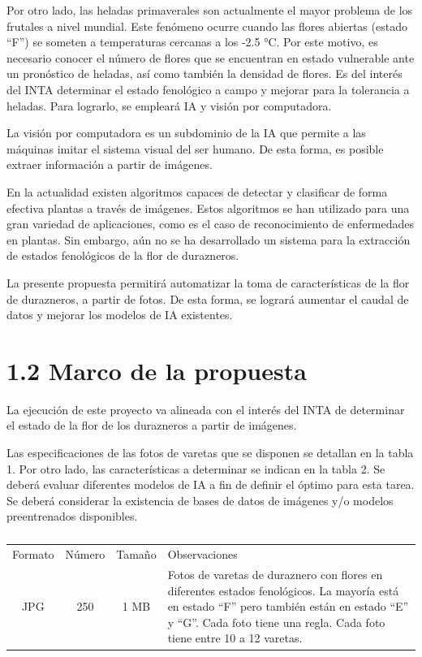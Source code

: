 \documentclass[
11pt, %
codirector, %
]{charter}
\begin{document}
Por otro lado, las heladas primaverales son actualmente el mayor problema de los frutales a nivel mundial. Este fenómeno ocurre cuando las flores abiertas (estado “F”) se someten a temperaturas cercanas a los -2.5 °C. Por este motivo, es necesario conocer el número de flores que se encuentran en estado vulnerable ante un pronóstico de heladas, así como también la densidad de flores. Es del interés del INTA determinar el estado fenológico a campo y mejorar para la tolerancia a heladas. Para lograrlo, se empleará IA y visión por computadora.

La visión por computadora es un subdominio de la IA que permite a las máquinas imitar el sistema visual del ser humano. De esta forma, es posible extraer información a partir de imágenes. 

En la actualidad existen algoritmos capaces de detectar y clasificar de forma efectiva plantas a través de imágenes. Estos algoritmos se han utilizado para una gran variedad de aplicaciones, como es el caso de reconocimiento de enfermedades en plantas. Sin embargo, aún no se ha desarrollado un sistema para la extracción de estados fenológicos de la flor de durazneros.

La presente propuesta permitirá automatizar la toma de características de la flor de durazneros, a partir de fotos. De esta forma, se logrará aumentar el caudal de datos y mejorar los modelos de IA existentes.

\section{1.2 Marco de la propuesta}
\label{sec:descripcion}

La ejecución de este proyecto va alineada con el interés del INTA de determinar el estado de la flor de los durazneros a partir de imágenes.

Las especificaciones de las fotos de varetas que se disponen se detallan en la tabla 1. Por otro lado, las características a determinar se indican en la tabla 2. Se deberá evaluar diferentes modelos de IA a fin de definir el óptimo para esta tarea. Se deberá considerar la existencia de bases de datos de imágenes y/o modelos preentrenados disponibles.

\renewcommand{\tablename}{Tabla}
\begin{table}[ht]
\begin{center}
\begin{tabularx}{\textwidth}{| c | c | c | X | }
\hline
\rowcolor[HTML]{C0C0C0}
\multicolumn{4}{ |c| }{Características de las fotos de duraznos} \\ \hline
Formato & Número & Tamaño & Observaciones \\ \hline
JPG     & 250    & 1 MB   & Fotos de varetas de duraznero con flores en           diferentes estados fenológicos. La mayoría está en estado “F” pero también están en estado “E” y “G”. Cada foto tiene una regla. Cada foto tiene entre 10 a 12 varetas. \\ \hline
\end{tabularx}
\caption{}
\label{tab:coches}
\end{center}
\end{table}
\end{document}
